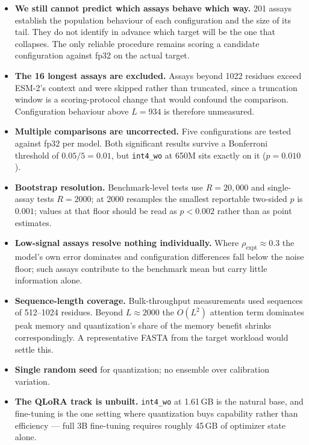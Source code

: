 \documentclass[11pt]{article}
\newcommand{\cfg}[1]{\texttt{#1}}
\begin{document}
\begin{itemize}
  \item \textbf{We still cannot predict which assays behave which way.} 201
        assays establish the population behaviour of each configuration and the
        size of its tail. They do not identify in advance which target will be
        the one that collapses. The only reliable procedure remains scoring a
        candidate configuration against fp32 on the actual target.
  \item \textbf{The 16 longest assays are excluded.} Assays beyond 1022
        residues exceed ESM-2's context and were skipped rather than truncated,
        since a truncation window is a scoring-protocol change that would
        confound the comparison. Configuration behaviour above $L = 934$ is
        therefore unmeasured.
  \item \textbf{Multiple comparisons are uncorrected.} Five configurations are
        tested against fp32 per model. Both significant results survive a
        Bonferroni threshold of $0.05/5 = 0.01$, but \cfg{int4\_wo} at 650M sits
        exactly on it ($p = 0.010$).
  \item \textbf{Bootstrap resolution.} Benchmark-level tests use $R = 20{,}000$
        and single-assay tests $R = 2000$; at 2000 resamples the smallest reportable
        two-sided $p$ is $0.001$; values at that floor should be read as
        $p < 0.002$ rather than as point estimates.
  \item \textbf{Low-signal assays resolve nothing individually.} Where
        $\rho_{\text{expt}} \approx 0.3$ the model's own error dominates and
        configuration differences fall below the noise floor; such assays
        contribute to the benchmark mean but carry little information alone.
  \item \textbf{Sequence-length coverage.} Bulk-throughput measurements used
        sequences of 512--1024 residues. Beyond $L \approx 2000$ the $O(L^2)$
        attention term dominates peak memory and quantization's share of the
        memory benefit shrinks correspondingly. A representative FASTA from the
        target workload would settle this.
  \item \textbf{Single random seed} for quantization; no ensemble over
        calibration variation.
  \item \textbf{The QLoRA track is unbuilt.} \cfg{int4\_wo} at 1.61\,GB is the
        natural base, and fine-tuning is the one setting where quantization buys
        capability rather than efficiency --- full 3B fine-tuning requires
        roughly 45\,GB of optimizer state alone.
\end{itemize}
\end{document}

